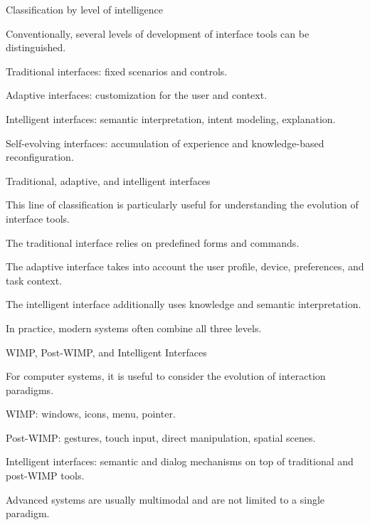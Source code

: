 \begin{frame}{Classification by level of intelligence}
	\topline
	\justifying
	
	Conventionally, several levels of development of interface tools can be distinguished.
	
	\begin{textitemize}
		\item Traditional interfaces: fixed scenarios and controls.
		\item Adaptive interfaces: customization for the user and context.
		\item Intelligent interfaces: semantic interpretation, intent modeling, explanation.
		\item Self-evolving interfaces: accumulation of experience and knowledge-based reconfiguration.
	\end{textitemize}
\end{frame}

\begin{frame}{Traditional, adaptive, and intelligent interfaces}
	\topline
	\justifying
	
	This line of classification is particularly useful for understanding the evolution of interface tools.
	
	\begin{textitemize}
		\item The traditional interface relies on predefined forms and commands.
		\item The adaptive interface takes into account the user profile, device, preferences, and task context.
		\item The intelligent interface additionally uses knowledge and semantic interpretation.
		\item In practice, modern systems often combine all three levels.
	\end{textitemize}
\end{frame}

\begin{frame}{WIMP, Post-WIMP, and Intelligent Interfaces}
	\topline
	\justifying
	
	For computer systems, it is useful to consider the evolution of interaction paradigms.
	
	\begin{textitemize}
		\item WIMP: windows, icons, menu, pointer.
		\item Post-WIMP: gestures, touch input, direct manipulation, spatial scenes.
		\item Intelligent interfaces: semantic and dialog mechanisms on top of traditional and post-WIMP tools.
		\item Advanced systems are usually multimodal and are not limited to a single paradigm.
	\end{textitemize}
\end{frame}

